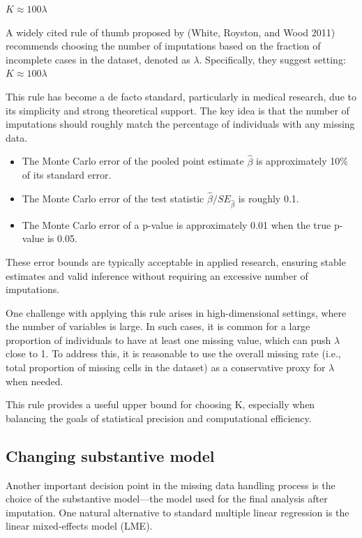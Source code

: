\documentclass{article}
\begin{document}
\(K \approx 100\lambda\)

A widely cited rule of thumb proposed by (White, Royston, and Wood 2011)
recommends choosing the number of imputations based on the fraction of
incomplete cases in the dataset, denoted as \(\lambda\). Specifically,
they suggest setting:\(K \approx 100\lambda\)

This rule has become a de facto standard, particularly in medical
research, due to its simplicity and strong theoretical support. The key
idea is that the number of imputations should roughly match the
percentage of individuals with any missing data.

\begin{itemize}
\item
  The Monte Carlo error of the pooled point estimate \(\hat{\beta}\) is
  approximately 10\% of its standard error.
\item
  The Monte Carlo error of the test statistic
  \(\hat{\beta}/SE_{\hat{\beta}}\) is roughly 0.1.
\item
  The Monte Carlo error of a p-value is approximately 0.01 when the true
  p-value is 0.05.
\end{itemize}

These error bounds are typically acceptable in applied research,
ensuring stable estimates and valid inference without requiring an
excessive number of imputations.

One challenge with applying this rule arises in high-dimensional
settings, where the number of variables is large. In such cases, it is
common for a large proportion of individuals to have at least one
missing value, which can push \(\lambda\) close to 1. To address this,
it is reasonable to use the overall missing rate (i.e., total proportion
of missing cells in the dataset) as a conservative proxy for \(\lambda\)
when needed.

This rule provides a useful upper bound for choosing K, especially when
balancing the goals of statistical precision and computational
efficiency.

\subsection{Changing substantive
model}\label{changing-substantive-model}

Another important decision point in the missing data handling process is
the choice of the substantive model---the model used for the final
analysis after imputation. One natural alternative to standard multiple
linear regression is the linear mixed-effects model (LME).
\end{document}
